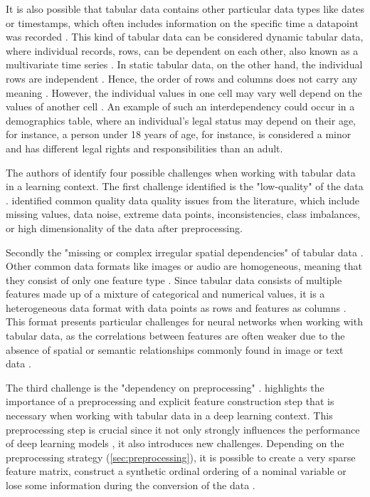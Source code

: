 It is also possible that tabular data contains other particular data types like dates or timestamps, which often includes information on the specific time a datapoint was recorded \cite{hernandez2022SyntheticDataGeneration}.
This kind of tabular data can be considered dynamic tabular data, where individual records, \ie rows, can be dependent on each other, also known as a multivariate time series \cite{padhi2021TabularTransformersModeling}.
In static tabular data, on the other hand, the individual rows are independent \cite{padhi2021TabularTransformersModeling}.
Hence, the order of rows and columns does not carry any meaning \cite{somepalli2021SAINTImprovedNeural}.
However, the individual values in one cell may vary well depend on the values of another cell \cite{lederrey2022DATGANIntegratingExperta}.
An example of such an interdependency could occur in a demographics table, where an individual's legal status may depend on their age, 
for instance, a person under 18 years of age, for instance, is considered a minor and has different legal rights and responsibilities than an adult.

The authors of \cite{borisov2022DeepNeuralNetworks} identify four possible challenges when working with tabular data in a learning context.
The first challenge identified is the "low-quality" of the data \cite[p. 4]{borisov2022DeepNeuralNetworks}. 
\cite{borisov2022DeepNeuralNetworks} identified common quality data quality issues from the literature, which include missing values, data noise, extreme data points, inconsistencies, class imbalances, or high dimensionality of the data after preprocessing.

Secondly the "missing or complex irregular spatial dependencies" of tabular data \cite[p. 4]{borisov2022DeepNeuralNetworks}. 
Other common data formats like images or audio are homogeneous, meaning that they consist of only one feature type \cite{borisov2022DeepNeuralNetworks}.
Since tabular data consists of multiple features made up of a mixture of categorical and numerical values, it is a heterogeneous data format with data points as rows and features as columns \cite{borisov2022DeepNeuralNetworks}.
This format presents particular challenges for neural networks when working with tabular data, as the correlations between features are often weaker due to the absence of spatial or semantic relationships commonly found in image or text data \cite{borisov2022DeepNeuralNetworks, yoon2020VIMEExtendingSuccess}.

The third challenge is the "dependency on preprocessing" \cite[p. 4]{borisov2022DeepNeuralNetworks}. 
\cite{borisov2022DeepNeuralNetworks} highlights the importance of a preprocessing and explicit feature construction step that is necessary when working with tabular data in a deep learning context.
This preprocessing step is crucial since it not only strongly influences the performance of deep learning models \cite{gorishniy2022EmbeddingsNumericalFeatures}, it also introduces new challenges. 
Depending on the preprocessing strategy (\autoref{sec:preprocessing}), it is possible to create a very sparse feature matrix, construct a synthetic ordinal ordering of a nominal variable or lose some information during the conversion of the data \cite{borisov2022DeepNeuralNetworks}.

